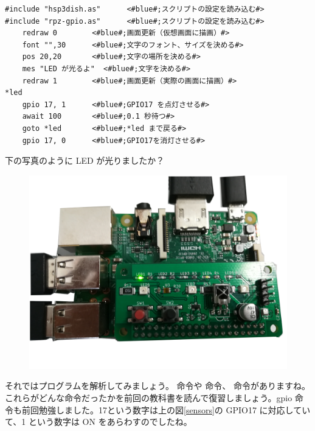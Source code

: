 \begin{lstlisting}[caption=led.hsp,label=led.hsp]
#include "hsp3dish.as"		<#blue#;スクリプトの設定を読み込む#>
#include "rpz-gpio.as"		<#blue#;スクリプトの設定を読み込む#>
	redraw 0		<#blue#;画面更新（仮想画面に描画）#>
	font "",30		<#blue#;文字のフォント、サイズを決める#>
	pos 20,20		<#blue#;文字の場所を決める#>
	mes "LED が光るよ"	<#blue#;文字を決める#>
	redraw 1		<#blue#;画面更新（実際の画面に描画）#>
*led
	gpio 17, 1		<#blue#;GPIO17 を点灯させる#>
	await 100		<#blue#;0.1 秒待つ#>
	goto *led		<#blue#;*led まで戻る#>
	gpio 17, 0		<#blue#;GPIO17を消灯させる#>
\end{lstlisting}

下の写真のように LED が光りましたか？\\

\begin{figure}[H]
    \centering
    \includegraphics[width=\linewidth]{images/chap03/text03-img032.jpg}
\end{figure}

それではプログラムを解析してみましょう。 命令や  命令、  命令がありますね。これらがどんな命令だったかを前回の教科書を読んで復習しましょう。gpio 命令も前回勉強しました。17という数字は上の図\ref{sensors}の GPIO17 に対応していて、1 という数字は ON をあらわすのでしたね。\\

